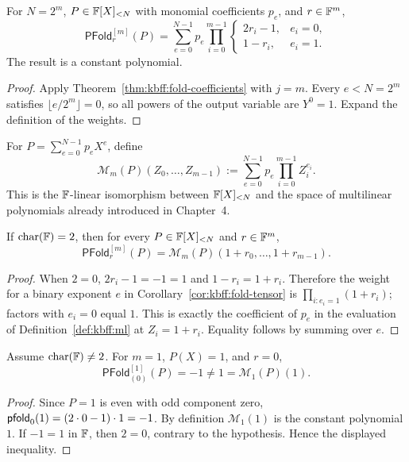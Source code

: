 \begin{corollary}\label{cor:kbff:fold-tensor}
For $N=2^m$, $P\in\mathbb{F}[X]_{<N}$ with monomial coefficients $p_e$, and $r\in\mathbb{F}^m$,
\[
 \boxed{\mathsf{PFold}^{[m]}_r(P)
 =\sum_{e=0}^{N-1}p_e
   \prod_{i=0}^{m-1}
     \begin{cases}2r_i-1,&e_i=0,\\1-r_i,&e_i=1.\end{cases}}
\]
The result is a constant polynomial.
\end{corollary}
\begin{proof}
Apply Theorem~\ref{thm:kbff:fold-coefficients} with $j=m$. Every $e<N=2^m$ satisfies $\lfloor e/2^m\rfloor=0$, so all powers of the output variable are $Y^0=1$. Expand the definition of the weights.
\end{proof}

\begin{definition}\label{def:kbff:ml}
For $P=\sum_{e=0}^{N-1}p_eX^e$, define
\[
 \mathscr M_m(P)(Z_0,\ldots,Z_{m-1})
 :=\sum_{e=0}^{N-1}p_e\prod_{i=0}^{m-1}Z_i^{e_i}.
\]
This is the $\mathbb{F}$-linear isomorphism between $\mathbb{F}[X]_{<N}$ and the space of multilinear polynomials already introduced in Chapter~4.
\end{definition}

\begin{lemma}\label{lem:kbff:char2}
If $\operatorname{char}(\mathbb{F})=2$, then for every $P\in\mathbb{F}[X]_{<N}$ and $r\in\mathbb{F}^m$,
\[
 \mathsf{PFold}^{[m]}_r(P)=
 \mathscr M_m(P)(1+r_0,\ldots,1+r_{m-1}).
\]
\end{lemma}
\begin{proof}
When $2=0$, $2r_i-1=-1=1$ and $1-r_i=1+r_i$. Therefore the weight for a binary exponent $e$ in Corollary~\ref{cor:kbff:fold-tensor} is
$\prod_{i:e_i=1}(1+r_i)$; factors with $e_i=0$ equal $1$. This is exactly the coefficient of $p_e$ in the evaluation of Definition~\ref{def:kbff:ml} at $Z_i=1+r_i$. Equality follows by summing over $e$.
\end{proof}

\begin{proposition}\label{prop:kbff:not-char2}
Assume $\operatorname{char}(\mathbb{F})\neq2$. For $m=1$, $P(X)=1$, and $r=0$,
\[
 \mathsf{PFold}^{[1]}_{(0)}(P)=-1\neq1
 =\mathscr M_1(P)(1).
\]
\end{proposition}
\begin{proof}
Since $P=1$ is even with odd component zero,
$\mathsf{pfold}_0(1)=(2\cdot0-1)\cdot1=-1$. By definition $\mathscr M_1(1)$ is the constant polynomial $1$. If $-1=1$ in $\mathbb{F}$, then $2=0$, contrary to the hypothesis. Hence the displayed inequality.
\end{proof}

